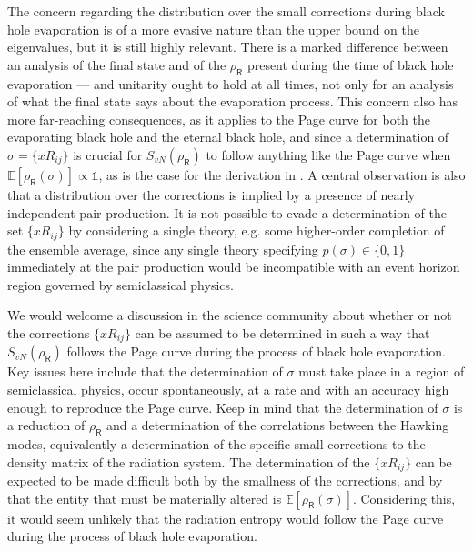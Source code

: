 \documentclass[11pt]{article}
\numberwithin{equation}{section}
\begin{document}
The concern regarding the distribution over the small corrections during black hole evaporation is of a more evasive nature than the upper bound on the eigenvalues, but it is still highly relevant. There is a marked difference between an analysis of the final state and of the $\rho_\textsf{R}$ present during the time of black hole evaporation --- and unitarity ought to hold at all times, not only for an analysis of what the final state says about the evaporation process. This concern also has more far-reaching consequences, as it applies to the Page curve for both the evaporating black hole and the eternal black hole, and since a determination of $\sigma=\{xR_{ij}\}$ is crucial for $S_{vN}(\rho_\textsf{R})$ to follow anything like the Page curve when $\mathbb{E}[\rho_\textsf{R}(\sigma)]\propto\mathbb{1}$, as is the case for the derivation in \cite{Penington:2019kki}. A central observation is also that a distribution over the corrections is implied by a presence of nearly independent pair production. It is not possible to evade a determination of the set $\{xR_{ij}\}$ by considering a single theory, e.g. some higher-order completion of the ensemble average, since any single theory specifying $p(\sigma)\in\{0,1\}$ immediately at the pair production would be incompatible with an event horizon region governed by semiclassical physics.

We would welcome a discussion in the science community about whether or not the corrections $\{xR_{ij}\}$ can be assumed to be determined in such a way that $S_{vN}(\rho_\textsf{R})$ follows the Page curve during the process of black hole evaporation. Key issues here include that the determination of $\sigma$ must take place in a region of semiclassical physics, occur spontaneously, at a rate and with an accuracy high enough to reproduce the Page curve. Keep in mind that the determination of $\sigma$ is a reduction of $\rho_\textsf{R}$ and a determination of the correlations between the Hawking modes, equivalently a determination of the specific small corrections to the density matrix of the radiation system. The determination of the $\{xR_{ij}\}$ can be expected to be made difficult both by the smallness of the corrections, and by that the entity that must be materially altered is $\mathbb{E}[\rho_\textsf{R}(\sigma)]$. Considering this, it would seem unlikely that the radiation entropy would follow the Page curve during the process of black hole evaporation.
\end{document}
